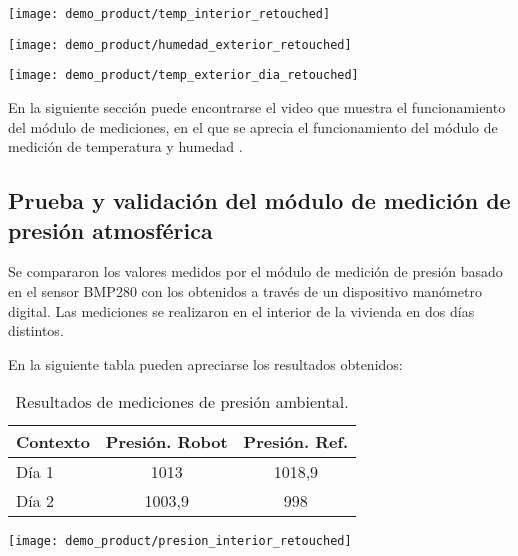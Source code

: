 \begin{center}
\texttt{[image: demo\_product/temp\_interior\_retouched]}
  \label{fig:temp_interior_retouched}
\end{center}


\begin{center}
\texttt{[image: demo\_product/humedad\_exterior\_retouched]}
  \label{fig:humedad_exterior_retouched}
\end{center}

\begin{center}
\texttt{[image: demo\_product/temp\_exterior\_dia\_retouched]}
  \label{fig:temp_exterior_dia_retouched}
\end{center}


En la siguiente sección puede encontrarse el video que muestra el funcionamiento del módulo de mediciones, en el que se aprecia el funcionamiento del módulo de medición de temperatura y humedad \cite{Demo_Mediciones}.

\subsection{Prueba y validación del módulo de medición de presión atmosférica}

Se compararon los valores medidos por el módulo de medición de presión basado en el sensor BMP280 con los obtenidos a través de un dispositivo manómetro digital. Las mediciones se realizaron en el interior de la vivienda en dos días distintos.

En la siguiente tabla pueden apreciarse los resultados obtenidos:

\begin{table}[h]
\centering
\caption[Resultados de mediciones de presión ambiental.]{Resultados de mediciones de presión ambiental.}
\begin{tabular}{l c c}
\toprule
\textbf{Contexto} & \textbf{Presión. Robot} & \textbf{Presión. Ref.} \\
\midrule
Día 1 & 1013 & 1018,9 \\
Día 2 & 1003,9 & 998 \\
\bottomrule
\hline
\end{tabular}
\end{table}

\begin{center}
\texttt{[image: demo\_product/presion\_interior\_retouched]}
  \label{fig:humedad_interior}
\end{center}

